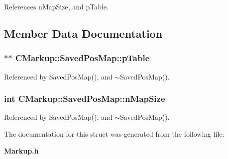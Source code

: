 References nMapSize, and pTable.

\subsection{Member Data Documentation}
\subsubsection[pTable]{$\ast$$\ast$ {\bf CMarkup::SavedPosMap::pTable}}\label{structCMarkup_1_1SavedPosMap_8ebb44e96f6781e5d1d044a18a3d989d}




Referenced by SavedPosMap(), and $\sim$SavedPosMap().
\subsubsection[nMapSize]{\setlength{\rightskip}{0pt plus 5cm}int {\bf CMarkup::SavedPosMap::nMapSize}}\label{structCMarkup_1_1SavedPosMap_b5b1c02cb1321c0f1007dc3cd01a34c7}




Referenced by SavedPosMap(), and $\sim$SavedPosMap().

The documentation for this struct was generated from the following file:\begin{CompactItemize}
\item 
{\bf Markup.h}\end{CompactItemize}

